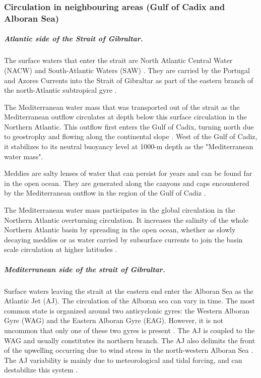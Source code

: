 \subsubsection{Circulation in neighbouring areas (Gulf of Cadix and Alboran Sea)}

\subparagraph{Atlantic side of the Strait of Gibraltar.}

The surface waters that enter the strait are North Atlantic Central Water (NACW) and South-Atlantic Waters (SAW) \citep{millot_2014,naranjo_2015}. They are carried by the Portugal and Azores Currents into the Strait of Gibraltar as part of the eastern branch of the north-Atlantic subtropical gyre \citep{barton_2001}.

The Mediterranean water mass that was transported out of the strait as the Mediterranean outflow circulates at depth below this surface circulation in the Northern Atlantic. This outflow first enters the Gulf of Cadix, turning north due to geostrophy and flowing along the continental slope \citep{price_1993,gasser_2017}. West of the Gulf of Cadiz, it stabilizes to its neutral buoyancy level at 1000-m depth as the "Mediterranean water mass"\citep{price_1993}.

Meddies are salty lenses of water that can persist for years and can be found far in the open ocean. They are generated along the canyons and caps encountered by the Mediterranean outflow in the region of the Gulf of Cadiz \citep{bashmachnikov_2015}. 

The Mediterranean water mass participates in the global circulation in the Northern Atlantic overturning circulation. It increases the salinity of the whole Northern Atlantic basin by spreading in the open ocean, whether as slowly decaying meddies or as water carried by subsurface currents to join the basin scale circulation at higher latitudes \citep{price_1993,jia_2007}.

\subparagraph{Mediterranean side of the strait of Gibraltar.} 

Surface waters leaving the strait at the eastern end enter the Alboran Sea as the Atlantic Jet (AJ). The circulation of the Alboran sea can vary in time. The most common state is organized around two anticyclonic gyres: the Western Alboran Gyre (WAG) and the Eastern Alboran Gyre (EAG). However, it is not uncommon that only one of these two gyres is present \citep{millot_2005}. The AJ is coupled to the WAG and usually constitutes its northern branch. The AJ also delimits the front of the upwelling occurring due to wind stress in the north-western Alboran Sea \citep{sarhan_2000}. The AJ variability is mainly due to meteorological and tidal forcing, and can destabilize this system \citep{sanchez-garrido_2013,lorente_2019}.

